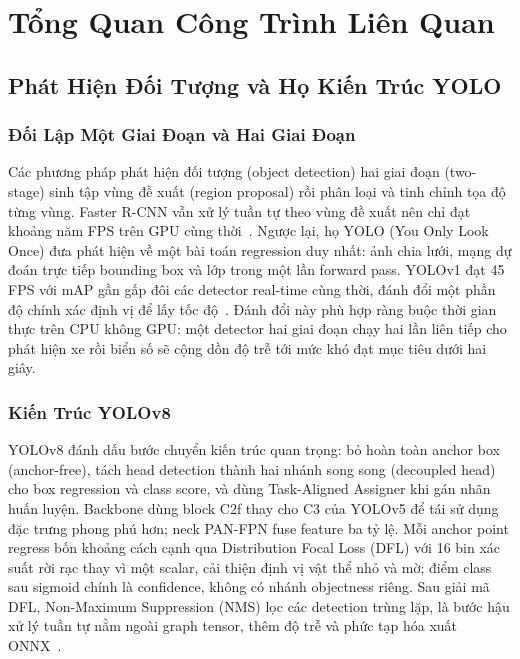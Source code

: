 \chapter{Tổng Quan Công Trình Liên Quan}
\label{ch:lienquan}

\section{Phát Hiện Đối Tượng và Họ Kiến Trúc YOLO}

\subsection{Đối Lập Một Giai Đoạn và Hai Giai Đoạn}

Các phương pháp phát hiện đối tượng (object detection) hai giai đoạn (two-stage) sinh
tập vùng đề xuất (region proposal) rồi phân loại và tinh chỉnh tọa độ từng vùng. Faster
R-CNN vẫn xử lý tuần tự theo vùng đề xuất nên chỉ đạt khoảng năm FPS trên GPU cùng
thời~\autocite{ren2015fasterrcnn}. Ngược lại, họ YOLO (You Only Look
Once) đưa phát hiện về một bài toán regression duy nhất: ảnh chia lưới, mạng dự đoán
trực tiếp bounding box và lớp trong một lần forward pass. YOLOv1 đạt 45 FPS với mAP gần
gấp đôi các detector real-time cùng thời, đánh đổi một phần độ chính xác định vị để lấy
tốc độ~\autocite{redmon2016yolo}. Đánh đổi này phù hợp ràng buộc thời gian thực trên CPU
không GPU: một detector hai giai đoạn chạy hai lần liên tiếp cho phát hiện xe rồi biển số
sẽ cộng dồn độ trễ tới mức khó đạt mục tiêu dưới hai giây.

\subsection{Kiến Trúc YOLOv8}
\label{sec:yolov8}

YOLOv8 đánh dấu bước chuyển kiến trúc quan trọng: bỏ hoàn toàn anchor box (anchor-free),
tách head detection thành hai nhánh song song (decoupled head) cho box regression và
class score, và dùng Task-Aligned Assigner khi gán nhãn huấn luyện. Backbone dùng block
C2f thay cho C3 của YOLOv5 để tái sử dụng đặc trưng phong phú hơn; neck PAN-FPN fuse
feature ba tỷ lệ. Mỗi anchor point regress bốn khoảng cách cạnh qua Distribution Focal
Loss (DFL) với 16 bin xác suất rời rạc thay vì một scalar, cải thiện định vị vật thể nhỏ
và mờ; điểm class sau sigmoid chính là confidence, không có nhánh objectness riêng. Sau
giải mã DFL, Non-Maximum Suppression (NMS) lọc các detection trùng lặp, là bước hậu xử lý
tuần tự nằm ngoài graph tensor, thêm độ trễ và phức tạp hóa xuất
ONNX~\autocite{jocher2023yolov8,terven2023comprehensive}.


